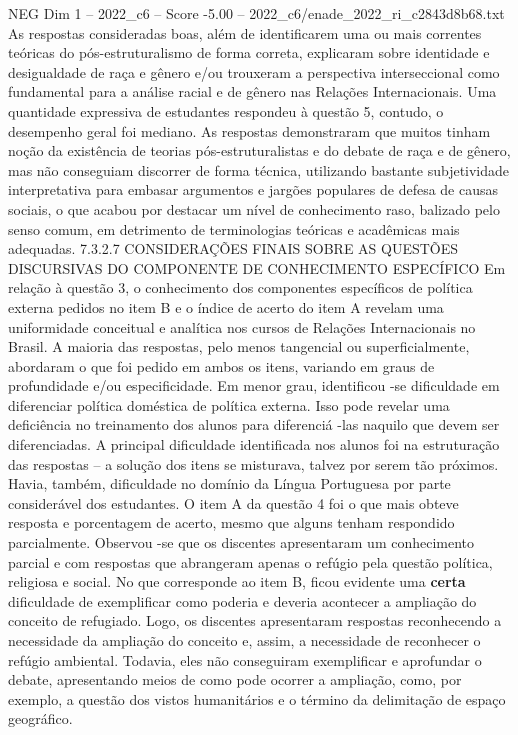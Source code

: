 \begin{textsample}{NEG Dim 1 – 2022\_c6 – Score -5.00 – 2022\_c6/enade\_2022\_ri\_c2843d8b68.txt}
As respostas consideradas boas, além de identificarem uma ou mais correntes teóricas do pós-estruturalismo de forma correta, explicaram sobre identidade e desigualdade de raça e gênero e/ou trouxeram a perspectiva interseccional como fundamental para a análise racial e de gênero nas Relações Internacionais.
Uma quantidade expressiva de estudantes respondeu à questão 5, contudo, o desempenho geral foi mediano.
As respostas demonstraram que muitos tinham noção da existência de teorias pós-estruturalistas e do debate de raça e de gênero, mas não conseguiam discorrer de forma técnica, utilizando bastante subjetividade interpretativa para embasar argumentos e jargões populares de defesa de causas sociais, o que acabou por destacar um nível de conhecimento raso, balizado pelo senso comum, em detrimento de terminologias teóricas e acadêmicas mais adequadas. 7.3.2.7 CONSIDERAÇÕES FINAIS SOBRE AS QUESTÕES DISCURSIVAS DO COMPONENTE DE CONHECIMENTO ESPECÍFICO Em relação à questão 3, o conhecimento dos componentes específicos de política externa pedidos no item B e o índice de acerto do item A revelam uma uniformidade conceitual e analítica nos cursos de Relações Internacionais no Brasil.
A maioria das respostas, pelo menos tangencial ou superficialmente, abordaram o que foi pedido em ambos os itens, variando em graus de profundidade e/ou especificidade.
Em menor grau, identificou -se dificuldade em diferenciar política doméstica de política externa.
Isso pode revelar uma deficiência no treinamento dos alunos para diferenciá -las naquilo que devem ser diferenciadas.
A principal dificuldade identificada nos alunos foi na estruturação das respostas – a solução dos itens se misturava, talvez por serem tão próximos.
Havia, também, dificuldade no domínio da Língua Portuguesa por parte considerável dos estudantes.
O item A da questão 4 foi o que mais obteve resposta e porcentagem de acerto, mesmo que alguns tenham respondido parcialmente.
Observou -se que os discentes apresentaram um conhecimento parcial e com respostas que abrangeram apenas o refúgio pela questão política, religiosa e social.
No que corresponde ao item B, ficou evidente uma \textbf{certa} dificuldade de exemplificar como poderia e deveria acontecer a ampliação do conceito de refugiado.
Logo, os discentes apresentaram respostas reconhecendo a necessidade da ampliação do conceito e, assim, a necessidade de reconhecer o refúgio ambiental.
Todavia, eles não conseguiram exemplificar e aprofundar o debate, apresentando meios de como pode ocorrer a ampliação, como, por exemplo, a questão dos vistos humanitários e o término da delimitação de espaço geográfico.

\end{textsample}
